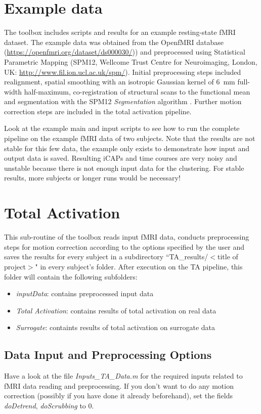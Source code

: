 \documentclass{article}
\begin{document}
\section{Example data}
The toolbox includes scripts and results for an example resting-state fMRI dataset. The example data was obtained from the OpenfMRI database (\href{https://openfmri.org/dataset/ds000030/)}{https://openfmri.org/dataset/ds000030/})) \cite{Poldrack2016} and preprocessed using Statistical Parametric Mapping (SPM12, Wellcome Trust Centre for Neuroimaging, London, UK: \href{http://www.fil.ion.ucl.ac.uk/spm/)}{http://www.fil.ion.ucl.ac.uk/spm/}). Initial preprocessing steps included realignment, spatial smoothing with an isotropic Gaussian kernel of \SI{6}{\milli\meter} full-width half-maximum, co-registration of structural scans to the functional mean and segmentation with the SPM12 \textit{Segmentation} algorithm \cite{Ashburner2005}. Further motion correction steps are included in the total activation pipeline.

Look at the example main and input scripts to see how to run the complete pipeline on the example fMRI data of two subjects. Note that the results are not stable for this few data, the example only exists to demonstrate how input and output data is saved. Resulting iCAPs and time courses are very noisy and unstable because there is not enough input data for the clustering. For stable results, more subjects or longer runs would be necessary!


\section{Total Activation}
This sub-routine of the toolbox reads input fMRI data, conducts preprocessing steps for motion correction according to the options specified by the user and saves the results for every subject in a subdirectory ``TA\_results/$<$title of project$>$" in every subject's folder. After execution on the TA pipeline, this folder will contain the  following subfolders:
\begin{itemize}
\item \textit{inputData}: contains preprocessed input data
\item \textit{Total Activation}: contains results of total activation on real data
\item \textit{Surrogate}: containts results of total activation on surrogate data
\end{itemize}

\subsection{Data Input and Preprocessing Options}
Have a look at the file \textit{Inputs\_TA\_Data.m} for the required inputs related to fMRI data reading and preprocessing. If you don't want to do any motion correction (possibly if you have done it already beforehand), set the fields \textit{doDetrend}, \textit{doScrubbing} to 0.
\end{document}
